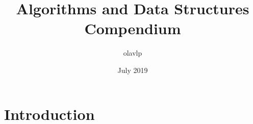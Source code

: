 \documentclass{article}
\title{Algorithms and Data Structures Compendium}
\author{olavlp }
\date{July 2019}
\begin{document}
\maketitle

\section{Introduction}
\end{document}
